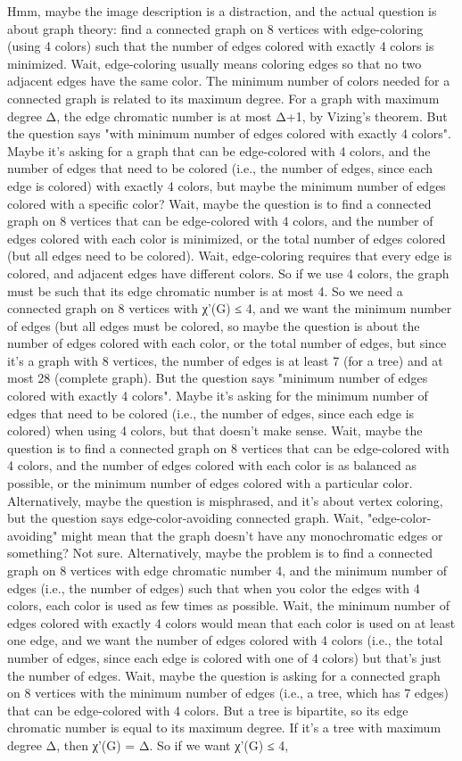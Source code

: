 Hmm, maybe the image description is a distraction, and the actual question is about graph theory: find a connected graph on 8 vertices with edge-coloring (using 4 colors) such that the number of edges colored with exactly 4 colors is minimized. Wait, edge-coloring usually means coloring edges so that no two adjacent edges have the same color. The minimum number of colors needed for a connected graph is related to its maximum degree. For a graph with maximum degree Δ, the edge chromatic number is at most Δ+1, by Vizing's theorem. But the question says "with minimum number of edges colored with exactly 4 colors". Maybe it's asking for a graph that can be edge-colored with 4 colors, and the number of edges that need to be colored (i.e., the number of edges, since each edge is colored) with exactly 4 colors, but maybe the minimum number of edges colored with a specific color? Wait, maybe the question is to find a connected graph on 8 vertices that can be edge-colored with 4 colors, and the number of edges colored with each color is minimized, or the total number of edges colored (but all edges need to be colored). Wait, edge-coloring requires that every edge is colored, and adjacent edges have different colors. So if we use 4 colors, the graph must be such that its edge chromatic number is at most 4. So we need a connected graph on 8 vertices with χ'(G) ≤ 4, and we want the minimum number of edges (but all edges must be colored, so maybe the question is about the number of edges colored with each color, or the total number of edges, but since it's a graph with 8 vertices, the number of edges is at least 7 (for a tree) and at most 28 (complete graph). But the question says "minimum number of edges colored with exactly 4 colors". Maybe it's asking for the minimum number of edges that need to be colored (i.e., the number of edges, since each edge is colored) when using 4 colors, but that doesn't make sense. Wait, maybe the question is to find a connected graph on 8 vertices that can be edge-colored with 4 colors, and the number of edges colored with each color is as balanced as possible, or the minimum number of edges colored with a particular color. Alternatively, maybe the question is misphrased, and it's about vertex coloring, but the question says edge-color-avoiding connected graph. Wait, "edge-color-avoiding" might mean that the graph doesn't have any monochromatic edges or something? Not sure. Alternatively, maybe the problem is to find a connected graph on 8 vertices with edge chromatic number 4, and the minimum number of edges (i.e., the number of edges) such that when you color the edges with 4 colors, each color is used as few times as possible. Wait, the minimum number of edges colored with exactly 4 colors would mean that each color is used on at least one edge, and we want the number of edges colored with 4 colors (i.e., the total number of edges, since each edge is colored with one of 4 colors) but that's just the number of edges. Wait, maybe the question is asking for a connected graph on 8 vertices with the minimum number of edges (i.e., a tree, which has 7 edges) that can be edge-colored with 4 colors. But a tree is bipartite, so its edge chromatic number is equal to its maximum degree. If it's a tree with maximum degree Δ, then χ'(G) = Δ. So if we want χ'(G) ≤ 4, 
